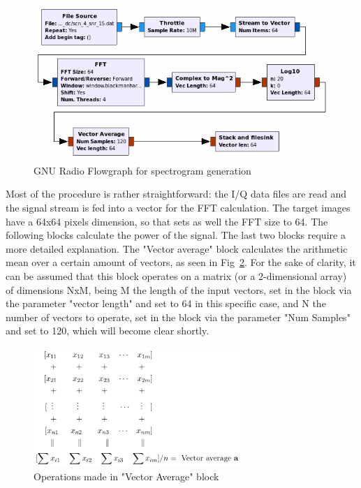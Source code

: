 \begin{figure}[!htb]
    \centering
    \includegraphics[width=\textwidth]{figures/specgram_generation}
    \caption{GNU Radio Flowgraph for spectrogram generation}
    \label{fig:specgram_generation}
\end{figure}

Most of the procedure is rather straightforward: the I/Q data files are read and the signal stream is fed into a vector for the \ac{FFT} calculation. The target images have a 64x64 pixels dimension, so that sets as well the FFT size to 64. The following blocks calculate the power of the signal. The last two blocks require a more detailed explanation.
The "Vector average" block calculates the arithmetic mean over a certain amount of vectors, as seen in Fig~\ref{fig:vectoravg}. For the sake of clarity, it can be assumed that this block operates on a matrix (or a 2-dimensional array) of dimensions NxM, being M the length of the input vectors, set in the block via the parameter "vector length" and set to 64 in this specific case, and N the number of vectors to operate, set in the block via the parameter "Num Samples" and set to 120, which will become clear shortly.\\

\begin{figure}[!htb]
    \centering
    \includegraphics[width=0.7\textwidth]{figures/vectoravg}
    \caption{Operations made in "Vector Average" block}
    \label{fig:vectoravg}
\end{figure}


